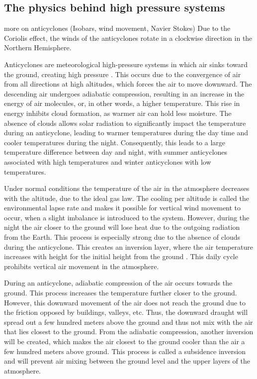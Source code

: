 \subsection{The physics behind high pressure systems}

more on anticyclones (Isobars, wind movement, Navier Stokes)
Due to the Coriolis effect, the winds of the anticyclones rotate in a clockwise direction in the Northern Hemisphere.

Anticyclones are meteorological high-pressure systems in which air sinks toward the ground, creating high pressure \cite{spiridonovCyclonesAnticyclonesSpringerLink2020}. This occurs due to the convergence of air from all directions at high altitudes, which forces the air to move downward. The descending air undergoes adiabatic compression, resulting in an increase in the energy of air molecules, or, in other words, a higher temperature. This rise in energy inhibits cloud formation, as warmer air can hold less moisture. The absence of clouds allows solar radiation to significantly impact the temperature during an anticyclone, leading to warmer temperatures during the day time and cooler temperatures during the night. Consequently, this leads to a large temperature difference between day and night, with summer anticyclones associated with high temperatures and winter anticyclones with low temperatures. 

Under normal conditions the temperature of the air in the atmosphere decreases with the altitude, due to the ideal gas law. The cooling per altitude is called the environmental lapse rate and makes it possible for vertical wind movement to occur, when a slight imbalance is introduced to the system. However, during the night the air closer to the ground will lose heat due to the outgoing radiation from the Earth. This process is especially strong due to the absence of clouds during the anticyclone. This creates an inversion layer, where the air temperature increases with height for the initial height from the ground \cite{gregohareWeatherClimateClimate2005}. This daily cycle prohibits vertical air movement in the atmosphere.

During an anticyclone, adiabatic compression of the air occurs towards the ground. This process increases the temperature further closer to the ground. However, this downward movement of the air does not reach the ground due to the friction opposed by buildings, valleys, etc. Thus, the downward draught will spread out a few hundred meters above the ground and thus not mix with the air that lies closest to the ground. From the adiabatic compression, another inversion will be created, which makes the air closest to the ground cooler than the air a few hundred meters above ground. This process is called a subsidence inversion and will prevent air mixing between the ground level and the upper layers of the atmosphere.


